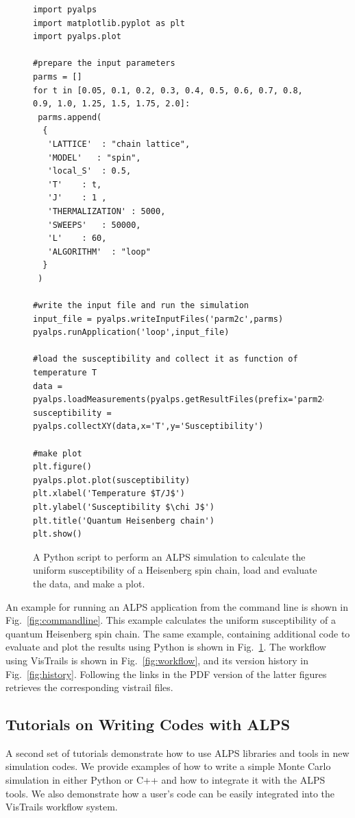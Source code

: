 \documentclass[12pt]{iopart}
\begin{document}
\begin{figure}
\begin{lstlisting}
import pyalps
import matplotlib.pyplot as plt
import pyalps.plot

#prepare the input parameters
parms = []
for t in [0.05, 0.1, 0.2, 0.3, 0.4, 0.5, 0.6, 0.7, 0.8, 0.9, 1.0, 1.25, 1.5, 1.75, 2.0]:
 parms.append(
  { 
   'LATTICE'  : "chain lattice", 
   'MODEL'   : "spin",
   'local_S'  : 0.5,
   'T'    : t,
   'J'    : 1 ,
   'THERMALIZATION' : 5000,
   'SWEEPS'   : 50000,
   'L'    : 60,
   'ALGORITHM'  : "loop"
  }
 )

#write the input file and run the simulation
input_file = pyalps.writeInputFiles('parm2c',parms)
pyalps.runApplication('loop',input_file)

#load the susceptibility and collect it as function of temperature T
data = pyalps.loadMeasurements(pyalps.getResultFiles(prefix='parm2c'),'Susceptibility')
susceptibility = pyalps.collectXY(data,x='T',y='Susceptibility')

#make plot
plt.figure()
pyalps.plot.plot(susceptibility)
plt.xlabel('Temperature $T/J$')
plt.ylabel('Susceptibility $\chi J$')
plt.title('Quantum Heisenberg chain')
plt.show()
\end{lstlisting}
\caption{A Python script to perform an ALPS simulation to calculate the uniform susceptibility of a Heisenberg spin chain, load and evaluate the data, and make a plot. }
\label{fig:python}
\end{figure}

An example for running an ALPS application from the command line is shown in Fig.~\ref{fig:commandline}. This example calculates the uniform susceptibility of a quantum Heisenberg spin chain. The same example, containing additional code to evaluate and plot the results using Python is shown in Fig.~\ref{fig:python}. The workflow using VisTrails is shown in Fig.~\ref{fig:workflow}, and its version history in Fig.~\ref{fig:history}. Following the links in the PDF version of the latter figures retrieves the corresponding vistrail files.

\subsection{Tutorials on Writing Codes with ALPS}

A second set of tutorials demonstrate how to use ALPS libraries and tools in new simulation codes. We provide examples of how to write a simple Monte Carlo simulation in either Python or C++ and how to integrate it with the ALPS tools. We also demonstrate how a user's code can be easily integrated into the VisTrails workflow system.
\end{document}
